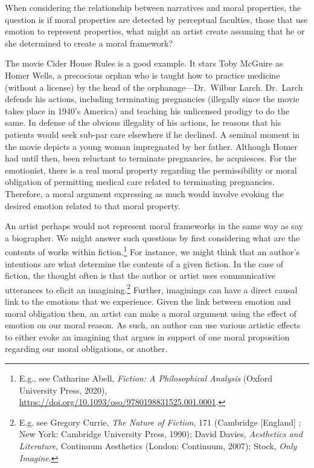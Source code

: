 \documentclass[phdthesis,12pt,final,a4paper]{wuthesis}
\theoremstyle{definition}
\theoremstyle{definition}
\theoremstyle{definition}
\theoremstyle{definition}
\theoremstyle{remark}
\begin{document}
When considering the relationship between narratives and moral properties, the question is if moral properties are detected by perceptual faculties, those that use emotion to represent properties, what might an artist create assuming that he or she determined to create a moral framework?

The movie Cider House Rules is a good example. It stars Toby McGuire as Homer Wells, a precocious orphan who is taught how to practice medicine (without a license) by the head of the orphanage---Dr.~Wilbur Larch. Dr.~Larch defends his actions, including terminating pregnancies (illegally since the movie takes place in 1940's America) and teaching his unlicensed prodigy to do the same. In defense of the obvious illegality of his actions, he reasons that his patients would seek sub-par care elsewhere if he declined. A seminal moment in the movie depicts a young woman impregnated by her father. Although Homer had until then, been reluctant to terminate pregnancies, he acquiesces. For the emotionist, there is a real moral property regarding the permissibility or moral obligation of permitting medical care related to terminating pregnancies. Therefore, a moral argument expressing as much would involve evoking the desired emotion related to that moral property.

An artist perhaps would not represent moral frameworks in the same way as say a biographer. We might answer such questions by first considering what are the contents of works within fiction.\footnote{E.g., see Catharine Abell, \emph{Fiction: {A Philosophical Analysis}} (Oxford University Press, 2020), \url{https://doi.org/10.1093/oso/9780198831525.001.0001}.} For instance, we might think that an author's intentions are what determine the contents of a given fiction. In the case of fiction, the thought often is that the author or artist uses communicative utterances to elicit an imagining.\footnote{E.g. see Gregory Currie, \emph{The Nature of Fiction}, 171 (Cambridge {[}England{]} ; New York: Cambridge University Press, 1990); David Davies, \emph{Aesthetics and Literature}, Continuum Aesthetics (London: Continuum, 2007); Stock, \emph{Only Imagine}.} Further, imaginings can have a direct causal link to the emotions that we experience. Given the link between emotion and moral obligation then, an artist can make a moral argument using the effect of emotion on our moral reason. As such, an author can use various artistic effects to either evoke an imagining that argues in support of one moral proposition regarding our moral obligations, or another.
\end{document}
